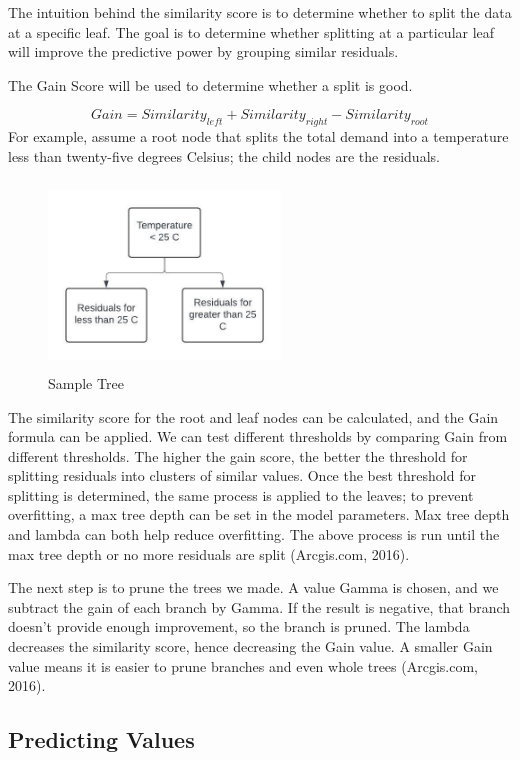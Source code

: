 \documentclass[mstat,12pt]{unswthesis}
\begin{document}
The intuition behind the similarity score is to determine whether to
split the data at a specific leaf. The goal is to determine whether
splitting at a particular leaf will improve the predictive power by
grouping similar residuals.

The Gain Score will be used to determine whether a split is good.

\[
Gain = {Similarity}_{left} + {Similarity}_{right} - {Similarity}_{root}
\] For example, assume a root node that splits the total demand into a
temperature less than twenty-five degrees Celsius; the child nodes are
the residuals.

\begin{figure}[H]
\centering
\includegraphics[width=0.55\textwidth, height=5cm]{C1.jpeg}
\caption{Sample Tree}\label{C1}
\end{figure}

The similarity score for the root and leaf nodes can be calculated, and
the Gain formula can be applied. We can test different thresholds by
comparing Gain from different thresholds. The higher the gain score, the
better the threshold for splitting residuals into clusters of similar
values. Once the best threshold for splitting is determined, the same
process is applied to the leaves; to prevent overfitting, a max tree
depth can be set in the model parameters. Max tree depth and lambda can
both help reduce overfitting. The above process is run until the max
tree depth or no more residuals are split (Arcgis.com, 2016).

The next step is to prune the trees we made. A value Gamma is chosen,
and we subtract the gain of each branch by Gamma. If the result is
negative, that branch doesn't provide enough improvement, so the branch
is pruned. The lambda decreases the similarity score, hence decreasing
the Gain value. A smaller Gain value means it is easier to prune
branches and even whole trees (Arcgis.com, 2016).

\subsection{Predicting Values}\label{predicting-values}
\end{document}
